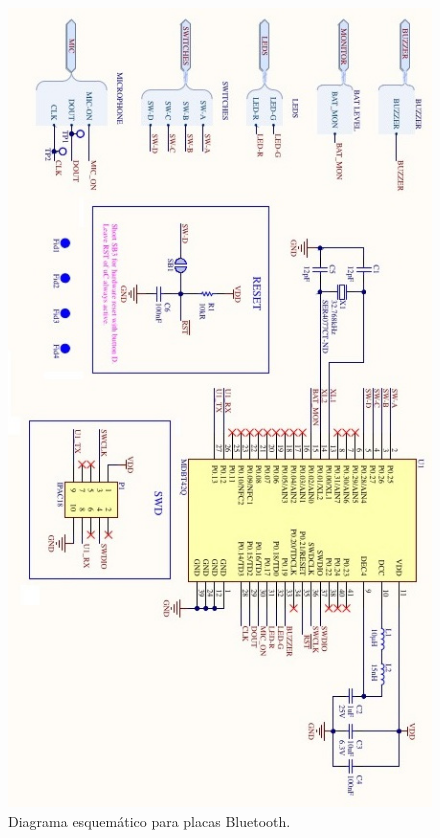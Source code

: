 \begin{figure}[htpb]
	\centering
	\includegraphics[scale=0.8]{./Figures/esquematico2.jpeg}
	\caption{Diagrama esquemático para placas Bluetooth.}
	\label{fig:esquematico}
\end{figure}



